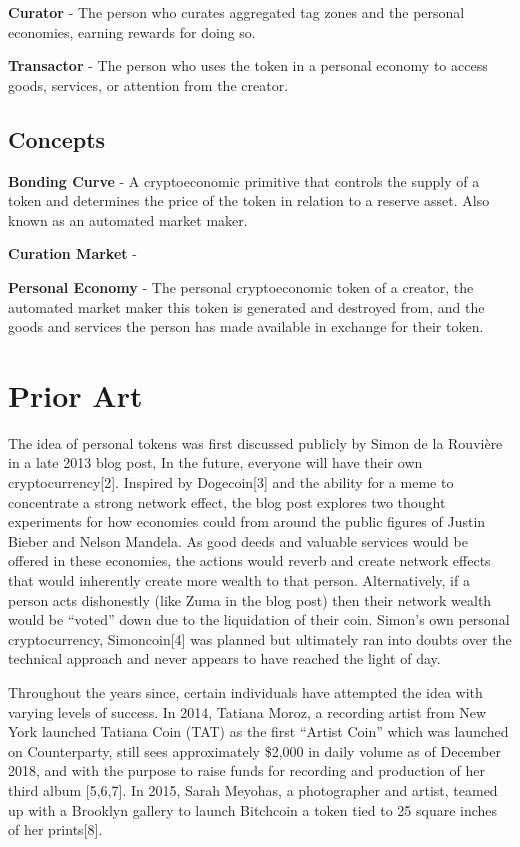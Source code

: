 \documentclass[a4paper]{article}
\begin{document}
\begin{appendices}
\noindent
\textbf{Curator} - The person who curates aggregated tag zones and the personal economies, earning rewards for doing so.
\medskip

\noindent
\textbf{Transactor} - The person who uses the token in a personal economy to access goods, services, or attention from the creator. 

\subsection{Concepts}

\textbf{Bonding Curve} - A cryptoeconomic primitive that controls the supply of a token and determines the price of the token in relation to a reserve asset. Also known as an automated market maker. 
\medskip

\noindent
\textbf{Curation Market} - 
\medskip

\noindent
\textbf{Personal Economy} - The personal cryptoeconomic token of a creator, the automated market maker this token is generated and destroyed from, and the goods and services the person has made available in exchange for their token.

\section{Prior Art}

The idea of personal tokens was first discussed publicly by Simon de la Rouvière in a late 2013 blog post,  In the future, everyone will have their own cryptocurrency[2]. Inspired by Dogecoin[3] and the ability for a meme to concentrate a strong network effect, the blog post explores two thought experiments for how economies could from around the public figures of Justin Bieber and Nelson Mandela. As good deeds and valuable services would be offered in these economies, the actions would reverb and create network effects that would inherently create more wealth to that person. Alternatively, if a person acts dishonestly (like Zuma in the blog post) then their network wealth would be “voted” down due to the liquidation of their coin.  Simon’s own personal cryptocurrency, Simoncoin[4] was planned but ultimately ran into doubts over the technical approach and never appears to have reached the light of day.

	Throughout the years since, certain individuals have attempted the idea with varying levels of success. In 2014, Tatiana Moroz, a recording artist from New York launched Tatiana Coin (TAT) as the first “Artist Coin” which was launched on Counterparty, still sees approximately \$2,000 in daily volume as of December 2018, and with the purpose to raise funds for recording and production of her third album [5,6,7]. In 2015, Sarah Meyohas, a photographer and artist, teamed up with a Brooklyn gallery to launch Bitchcoin a token tied to 25 square inches of her prints[8]. 

\end{appendices}
\end{document}
